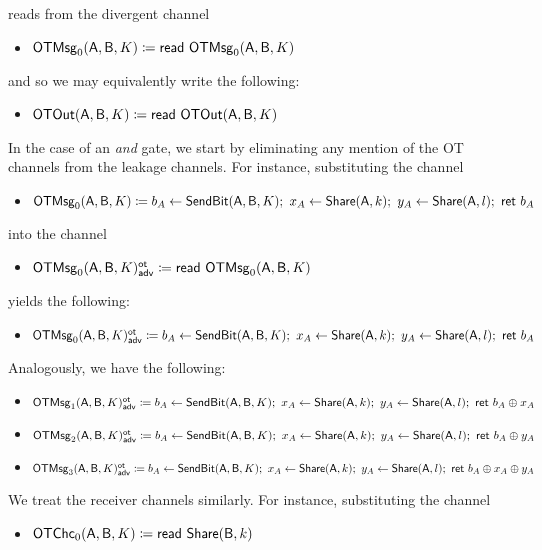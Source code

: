 reads from the divergent channel
\begin{itemize}
\item $\mathsf{OTMsg}_0(\mathsf{A},\mathsf{B},K) \coloneqq \mathsf{read} \ \mathsf{OTMsg}_0(\mathsf{A},\mathsf{B},K)$
\end{itemize}
and so we may equivalently write the following:
\begin{itemize}
\item $\mathsf{OTOut}(\mathsf{A},\mathsf{B},K) \coloneqq \mathsf{read} \ \mathsf{OTOut}(\mathsf{A},\mathsf{B},K)$
\end{itemize}
In the case of an \emph{and} gate, we start by eliminating any mention of the OT channels from the leakage channels. For instance, substituting the channel
\begin{itemize}
\item $\mathsf{OTMsg}_0(\mathsf{A},\mathsf{B},K) \coloneqq b_A \leftarrow \mathsf{SendBit}(\mathsf{A},\mathsf{B},K); \ x_A \leftarrow \mathsf{Share}(\mathsf{A},k); \ y_A \leftarrow \mathsf{Share}(\mathsf{A},l); \ \mathsf{ret} \ b_A$
\end{itemize}
into the channel
\begin{itemize}
\item {\color{blue} $\mathsf{OTMsg}_0(\mathsf{A},\mathsf{B},K)^{\mathsf{ot}}_{\mathsf{adv}} \coloneqq \mathsf{read} \ \mathsf{OTMsg}_0(\mathsf{A},\mathsf{B},K)$}
\end{itemize}
yields the following:
\begin{itemize}
\item {\color{blue} $\LeakOTMsg_0(\A,\B,K)^\ot_\adv \coloneqq b_A \leftarrow \SendBit(\A,\B,K); \ x_A \leftarrow \Share(\A,k); \ y_A \leftarrow \Share(\A,l); \ \ret{b_A}$}
\end{itemize}
Analogously, we have the following:
\begin{itemize}
\item {\color{blue} $\mathsf{OTMsg}_1(\mathsf{A},\mathsf{B},K)^{\mathsf{ot}}_{\mathsf{adv}} \coloneqq b_A \leftarrow \mathsf{SendBit}(\mathsf{A},\mathsf{B},K); \ x_A \leftarrow \mathsf{Share}(\mathsf{A},k); \ y_A \leftarrow \mathsf{Share}(\mathsf{A},l); \ \mathsf{ret} \ b_A \oplus x_A$}
\item {\color{blue} $\mathsf{OTMsg}_2(\mathsf{A},\mathsf{B},K)^{\mathsf{ot}}_{\mathsf{adv}} \coloneqq b_A \leftarrow \mathsf{SendBit}(\mathsf{A},\mathsf{B},K); \ x_A \leftarrow \mathsf{Share}(\mathsf{A},k); \ y_A \leftarrow \mathsf{Share}(\mathsf{A},l); \ \mathsf{ret} \ b_A \oplus y_A$}
\item {\color{blue} $\mathsf{OTMsg}_3(\mathsf{A},\mathsf{B},K)^{\mathsf{ot}}_{\mathsf{adv}} \coloneqq b_A \leftarrow \mathsf{SendBit}(\mathsf{A},\mathsf{B},K); \ x_A \leftarrow \mathsf{Share}(\mathsf{A},k); \ y_A \leftarrow \mathsf{Share}(\mathsf{A},l); \ \mathsf{ret} \ b_A \oplus x_A \oplus y_A$}
\end{itemize}
We treat the receiver channels similarly. For instance, substituting the channel
\begin{itemize}
\item $\mathsf{OTChc}_0(\mathsf{A},\mathsf{B},K) \coloneqq \mathsf{read} \ \mathsf{Share}(\mathsf{B},k)$
\end{itemize}

